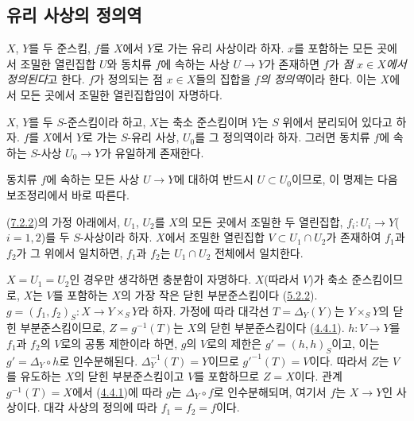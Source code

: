 \subsection{유리 사상의 정의역}
\label{subsection:I.7.2-ko}

\begin{env}[7.2.1]
\label{I.7.2.1-ko}
$X$, $Y$를 두 준스킴, $f$를 $X$에서 $Y$로 가는 유리 사상이라 하자.
$x$를 포함하는 모든 곳에서 조밀한 열린집합 $U$와 동치류 $f$에 속하는
사상 $U\to Y$가 존재하면 $f$가 \emph{점 $x\in X$에서 정의된다}고 한다.
$f$가 정의되는 점 $x\in X$들의 집합을 \emph{$f$의 정의역}이라 한다.
이는 $X$에서 모든 곳에서 조밀한 열린집합임이 자명하다.
\end{env}

\begin{proposition}[7.2.2]
\label{I.7.2.2-ko}
$X$, $Y$를 두 $S$-준스킴이라 하고, $X$는 축소 준스킴이며 $Y$는 $S$
위에서 분리되어 있다고 하자. $f$를 $X$에서 $Y$로 가는 $S$-유리
사상, $U_0$를 그 정의역이라 하자. 그러면 동치류 $f$에 속하는
$S$-사상 $U_0\to Y$가 유일하게 존재한다.
\end{proposition}

동치류 $f$에 속하는 모든 사상 $U\to Y$에 대하여 반드시
$U\subset U_0$이므로, 이 명제는 다음 보조정리에서 바로 따른다.

\begin{lemma}[7.2.2.1]
\label{I.7.2.2.1-ko}
(\hyperref[I.7.2.2-ko]{7.2.2})의 가정 아래에서, $U_1$, $U_2$를 $X$의
모든 곳에서 조밀한 두 열린집합, $f_i:U_i\to Y$($i=1,2$)를 두
$S$-사상이라 하자. $X$에서 조밀한 열린집합
$V\subset U_1\cap U_2$가 존재하여 $f_1$과 $f_2$가 그 위에서
일치하면, $f_1$과 $f_2$는 $U_1\cap U_2$ 전체에서 일치한다.
\end{lemma}

$X=U_1=U_2$인 경우만 생각하면 충분함이 자명하다. $X$(따라서 $V$)가
축소 준스킴이므로, $X$는 $V$를 포함하는 $X$의 가장 작은 닫힌 부분준스킴이다
(\hyperref[I.5.2.2-ko]{5.2.2}).
$g=(f_1,f_2)_S:X\to Y\times_S Y$라 하자. 가정에 따라 대각선
$T=\Delta_Y(Y)$는 $Y\times_S Y$의 닫힌 부분준스킴이므로,
$Z=g^{-1}(T)$는 $X$의 닫힌 부분준스킴이다
(\hyperref[I.4.4.1-ko]{4.4.1}). $h:V\to Y$를 $f_1$과 $f_2$의 $V$로의
공통 제한이라 하면, $g$의 $V$로의 제한은 $g'=(h,h)_S$이고, 이는
$g'=\Delta_Y\circ h$로 인수분해된다. $\Delta_Y^{-1}(T)=Y$이므로
$g'^{-1}(T)=V$이다. 따라서 $Z$는 $V$를 유도하는 $X$의 닫힌
부분준스킴이고 $V$를 포함하므로 $Z=X$이다. 관계 $g^{-1}(T)=X$에서
(\hyperref[I.4.4.1-ko]{4.4.1})에 따라
$g$는 $\Delta_Y\circ f$로 인수분해되며, 여기서 $f$는 $X\to Y$인
사상이다. 대각
사상의 정의에 따라 $f_1=f_2=f$이다.

